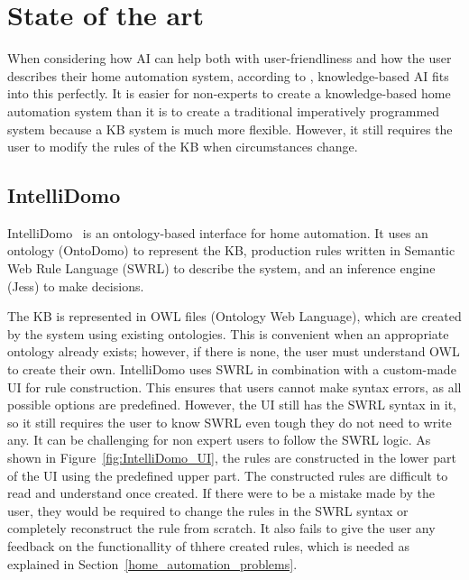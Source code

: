 \documentclass[11pt,a4paper]{report}
\begin{document}
\section{State of the art}
When considering how AI can help both with user-friendliness and how the user describes their home automation system, according to \cite{SOTA_KnowledgeBasedAIInHomeAutomation}, knowledge-based AI fits into this perfectly. It is easier for non-experts to create a knowledge-based home automation system than it is to create a traditional imperatively programmed system because a KB system is much more flexible. However, it still requires the user to modify the rules of the KB when circumstances change.

\subsection{IntelliDomo}
IntelliDomo~\cite{SOTA_OntologyBased} is an ontology-based interface for home automation. It uses an ontology (OntoDomo) to represent the KB, production rules written in Semantic Web Rule Language (SWRL) to describe the system, and an inference engine (Jess) to make decisions.

The KB is represented in OWL files (Ontology Web Language), which are created by the system using existing ontologies. This is convenient when an appropriate ontology already exists; however, if there is none, the user must understand OWL to create their own. IntelliDomo uses SWRL in combination with a custom-made UI for rule construction. This ensures that users cannot make syntax errors, as all possible options are predefined. However, the UI still has the SWRL syntax in it, so it still requires the user to know SWRL even tough they do not need to write any. It can be challenging for non expert users to follow the SWRL logic. As shown in Figure~\ref{fig:IntelliDomo_UI}, the rules are constructed in the lower part of the UI using the predefined upper part. The constructed rules are difficult to read and understand once created. If there were to be a mistake made by the user, they would be required to change the rules in the SWRL syntax or completely reconstruct the rule from scratch. It also fails to give the user any feedback on the functionallity of thhere created rules, which is needed as explained in Section~\ref{home_automation_problems}. 
\end{document}
